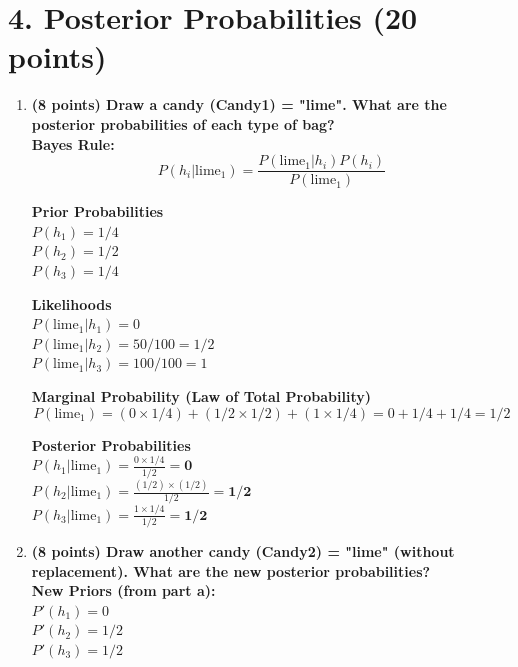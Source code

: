 \documentclass[12pt]{article}
\begin{document}
\section*{4. Posterior Probabilities (20 points)}

\begin{enumerate}[label=(\alph*)]
    \item \textbf{(8 points) Draw a candy (Candy1) = "lime". What are the posterior probabilities of each type of bag?}
    \\
    \textbf{Bayes Rule:}\\
    $$P(h_i | \text{lime}_1) = \frac{P(\text{lime}_1 | h_i) P(h_i)}{P(\text{lime}_1)}$$

    \textbf{Prior Probabilities} \\
    $P(h_1) = 1/4$ \\
    $P(h_2) = 1/2$ \\
    $P(h_3) = 1/4$

    \textbf{Likelihoods} \\
    $P(\text{lime}_1 | h_1) = 0$ \\
    $P(\text{lime}_1 | h_2) = 50/100 = 1/2$ \\
    $P(\text{lime}_1 | h_3) = 100/100 = 1$

    \textbf{Marginal Probability (Law of Total Probability)} \\
    $$P(\text{lime}_1) = (0 \times 1/4) + (1/2 \times 1/2) + (1 \times 1/4) = 0 + 1/4 + 1/4 = 1/2$$

    \textbf{Posterior Probabilities} \\
    $P(h_1 | \text{lime}_1) = \frac{0 \times 1/4}{1/2} = \textbf{0}$ \\
    $P(h_2 | \text{lime}_1) = \frac{(1/2) \times (1/2)}{1/2} = \textbf{1/2}$ \\
    $P(h_3 | \text{lime}_1) = \frac{1 \times 1/4}{1/2} = \textbf{1/2}$



    \item \textbf{(8 points) Draw another candy (Candy2) = "lime" (without replacement). What are the new posterior probabilities?}
    \\

    \textbf{New Priors (from part a):} \\
    $P'(h_1) = 0$ \\
    $P'(h_2) = 1/2$ \\
    $P'(h_3) = 1/2$


\end{enumerate}
\end{document}
